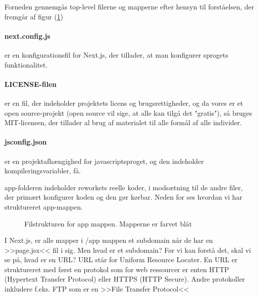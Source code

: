         Forneden gennemgås top-level filerne og mapperne efter hensyn til forståelsen, der fremgår af figur (\ref{fig:tlprojstruct})

        \paragraph{next.config.js} er en konfigurationsfil for Next.js, der tillader, at man konfigurer sprogets funktionalitet. 
        
        \paragraph{LICENSE-filen} er en fil, der indeholder projektets licens og brugsrettigheder, og da vores er et open source-projekt (open source vil sige, at alle kan tilgå det "gratis"), så bruges MIT-licensen, der tillader al brug af materialet til alle formål af alle individer. 
        
        \paragraph{jsconfig.json} er en projektafhængighed for javascriptsproget, og den indeholder kompileringsvariabler, få. 

        app-folderen indeholder reworkets reelle koder, i modsætning til de andre filer, der primært konfigurer koden og den gør kørbar. 
        Neden for ses hvordan vi har struktureret app-mappen. 
        \begin{figure}[H]
            \caption{Filstrukturen for app mappen. Mapperne er farvet blåt}
            \label{fig:tlprojstruct}
            \end{figure}
        I Next.js, er alle mapper i /app mappen et subdomain når de har en >>page.jsx<< fil i sig. Men hvad er et subdomain? Før vi kan forstå det, skal vi se på, hvad er en URL? URL står for 
        Uniform Resource Locater. En URL er struktureret med først en protokol som for web ressourcer er enten HTTP (Hypertext Transfer Protocol) eller HTTPS (HTTP Secure). Andre protokoller inkludere f.eks. FTP som er en >>File Transfer Protocol<<  

